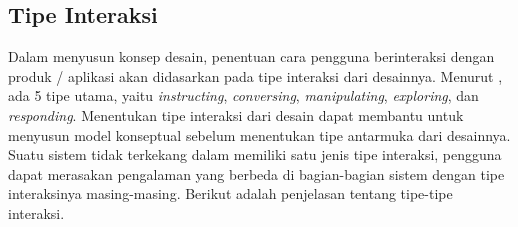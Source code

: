 \subsection{Tipe Interaksi}
\label{subsec:tipe_interaksi}

Dalam menyusun konsep desain, penentuan cara pengguna berinteraksi dengan produk / aplikasi akan didasarkan pada tipe interaksi dari desainnya. Menurut \textcite{PreeceRogersSharp15}, ada 5 tipe utama, yaitu \textit{instructing}, \textit{conversing}, \textit{manipulating}, \textit{exploring}, dan \textit{responding}. Menentukan tipe interaksi dari desain dapat membantu untuk menyusun model konseptual sebelum menentukan tipe antarmuka dari desainnya. Suatu sistem tidak terkekang dalam memiliki satu jenis tipe interaksi, pengguna dapat merasakan pengalaman yang berbeda di bagian-bagian sistem dengan tipe interaksinya masing-masing. Berikut adalah penjelasan tentang tipe-tipe interaksi.

